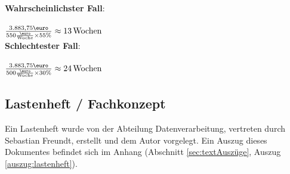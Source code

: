 \textbf{Wahrscheinlichster Fall}:\\
\\
$\frac{3.883,75\text{\euro}}{550\frac{\text{\euro}}{\text{Woche}} \times 55\text{\%}} \approx 13 \text{\,Wochen}$
\\


\textbf{Schlechtester Fall}:\\
\\
$\frac{3.883,75\text{\euro}}{500\frac{\text{\euro}}{\text{Woche}} \times 30\text{\%}} \approx 24 \text{\,Wochen}$
\\

\subsection{Lastenheft / Fachkonzept}
Ein Lastenheft wurde von der Abteilung Datenverarbeitung, vertreten durch Sebastian Freundt,
erstellt und dem Autor vorgelegt. Ein Auszug dieses Dokumentes befindet sich im Anhang  (Abschnitt \ref{sec:textAuszüge}, Auszug \ref{auszug:lastenheft}).\par


